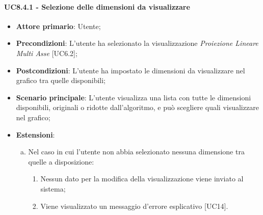 \paragraph{UC8.4.1 - Selezione delle dimensioni da visualizzare}
\begin{itemize}
	\item \textbf{Attore primario}: Utente;
	\item \textbf{Precondizioni}: L'utente ha selezionato la visualizzazione \textit{Proiezione Lineare Multi Asse} [UC6.2];
	\item \textbf{Postcondizioni}: L'utente ha impostato le dimensioni da visualizzare nel grafico tra quelle disponibili;
	
	\item \textbf{Scenario principale}: L'utente visualizza una lista con tutte le dimensioni disponibili, originali o ridotte dall'algoritmo, e può scegliere quali visualizzare nel grafico;
	
	\item \textbf{Estensioni}:
	\begin{enumerate}[(a)]
		\item Nel caso in cui l'utente non abbia selezionato nessuna dimensione tra quelle a disposizione:
		\begin{enumerate}[1.]
			\item Nessun dato per la modifica della visualizzazione viene inviato al sistema;
			\item Viene visualizzato un messaggio d'errore esplicativo [UC14].
		\end{enumerate}
	\end{enumerate}
\end{itemize}